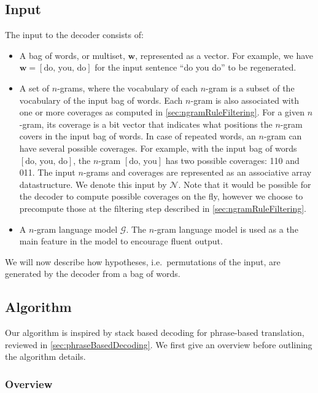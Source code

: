 \subsection{Input}

The input to the decoder consists of:
%
\begin{itemize}
  \item A bag of words, or multiset, $\bm{w}$, represented as a vector.
    For example, we have $\bm{w} = [\text{do, you, do}]$ for the
    input sentence ``do you do'' to be regenerated.
  \item A set of $n$-grams, where the
    vocabulary of each $n$-gram is a subset of the vocabulary of the
    input bag of words. Each $n$-gram is also associated with
    one or more coverages as computed in \autoref{sec:ngramRuleFiltering}.
    For a given $n$-gram, its coverage is a bit vector
    that indicates what positions the $n$-gram covers in the input bag of words.
    In case of repeated words, an $n$-gram can have several possible
    coverages. For example, with the input bag of words
    $[\text{do, you, do}]$, the $n$-gram $[\text{do, you}]$ has
    two possible coverages: 110 and 011.
    The input $n$-grams and coverages are represented as
    an associative array datastructure. We denote this
    input by $\mathcal{N}$. Note that it would be possible for the decoder
    to compute possible coverages on the fly, however we choose to precompute those
    at the filtering step described in \autoref{sec:ngramRuleFiltering}.
  \item A $n$-gram language model $\mathcal{G}$. The $n$-gram
    language model is used as a the main feature in the model to
    encourage fluent output.
\end{itemize}
%
We will now describe how hypotheses, i.e.\ permutations of the
input, are generated by the decoder from a bag of words.

\subsection{Algorithm}

Our algorithm is inspired by stack based decoding for phrase-based
translation, reviewed in \autoref{sec:phraseBasedDecoding}. We
first give an overview
before outlining the algorithm details.

\subsubsection{Overview}
\label{sec:gyroAlgorithmOverview}

